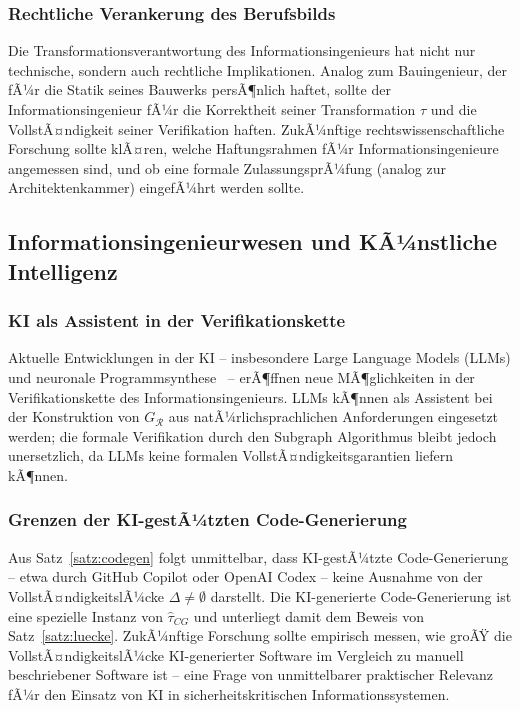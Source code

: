 ﻿\documentclass[a4paper,12pt]{article}
\theoremstyle{definition}
\begin{document}
\subsubsection{Rechtliche Verankerung des Berufsbilds}

Die Transformationsverantwortung des Informationsingenieurs hat nicht nur technische,
sondern auch rechtliche Implikationen. Analog zum Bauingenieur, der fÃ¼r die Statik
seines Bauwerks persÃ¶nlich haftet, sollte der Informationsingenieur fÃ¼r die Korrektheit
seiner Transformation $\tau$ und die VollstÃ¤ndigkeit seiner Verifikation haften.
ZukÃ¼nftige rechtswissenschaftliche Forschung sollte klÃ¤ren, welche Haftungsrahmen
fÃ¼r Informationsingenieure angemessen sind, und ob eine formale ZulassungsprÃ¼fung
(analog zur Architektenkammer) eingefÃ¼hrt werden sollte.

\subsection{Informationsingenieurwesen und KÃ¼nstliche Intelligenz}

\subsubsection{KI als Assistent in der Verifikationskette}

Aktuelle Entwicklungen in der KI -- insbesondere Large Language Models (LLMs) und
neuronale Programmsynthese~\cite{chen2021} -- erÃ¶ffnen neue MÃ¶glichkeiten in der
Verifikationskette des Informationsingenieurs. LLMs kÃ¶nnen als Assistent bei der
Konstruktion von $G_\mathcal{R}$ aus natÃ¼rlichsprachlichen Anforderungen eingesetzt
werden; die formale Verifikation durch den Subgraph Algorithmus bleibt jedoch
unersetzlich, da LLMs keine formalen VollstÃ¤ndigkeitsgarantien liefern kÃ¶nnen.

\subsubsection{Grenzen der KI-gestÃ¼tzten Code-Generierung}

Aus Satz~\ref{satz:codegen} folgt unmittelbar, dass KI-gestÃ¼tzte Code-Generierung --
etwa durch GitHub Copilot oder OpenAI Codex -- keine Ausnahme von der VollstÃ¤ndigkeitslÃ¼cke
$\Delta \neq \emptyset$ darstellt. Die KI-generierte Code-Generierung ist eine
spezielle Instanz von $\hat{\tau}_{CG}$ und unterliegt damit dem Beweis von
Satz~\ref{satz:luecke}. ZukÃ¼nftige Forschung sollte empirisch messen, wie groÃŸ die
VollstÃ¤ndigkeitslÃ¼cke KI-generierter Software im Vergleich zu manuell beschriebener
Software ist -- eine Frage von unmittelbarer praktischer Relevanz fÃ¼r den Einsatz von
KI in sicherheitskritischen Informationssystemen.
\end{document}
